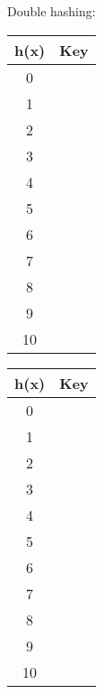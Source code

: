 \clearpage
Double hashing:

\begin{tabular}{|c|c|}
\hline
h(x) & Key \\ \hline\hline
0 & \hspace{4cm} \\ \hline
1 & \hspace{4cm} \\ \hline
2 & \hspace{4cm} \\ \hline
3 & \hspace{4cm} \\ \hline
4 & \hspace{4cm} \\ \hline
5 & \hspace{4cm} \\ \hline
6 & \hspace{4cm} \\ \hline
7 & \hspace{4cm} \\ \hline
8 & \hspace{4cm} \\ \hline
9 & \hspace{4cm} \\ \hline
10 & \hspace{4cm} \\ \hline
\end{tabular}
\begin{tabular}{|c|c|}
\hline
h(x) & Key \\ \hline\hline
0 & \hspace{3cm} \\ \hline
1 & \hspace{3cm} \\ \hline
2 & \hspace{3cm} \\ \hline
3 & \hspace{3cm} \\ \hline
4 & \hspace{3cm} \\ \hline
5 & \hspace{3cm} \\ \hline
6 & \hspace{3cm} \\ \hline
7 & \hspace{3cm} \\ \hline
8 & \hspace{3cm} \\ \hline
9 & \hspace{3cm} \\ \hline
10 & \hspace{3cm} \\ \hline
\end{tabular}

